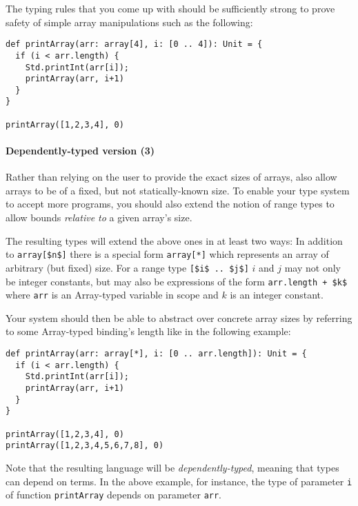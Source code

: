 The typing rules that you come up with should be sufficiently strong to prove safety of
simple array manipulations such as the following:

\begin{lstlisting}
def printArray(arr: array[4], i: [0 .. 4]): Unit = {
  if (i < arr.length) {
    Std.printInt(arr[i]);
    printArray(arr, i+1)
  }
}

printArray([1,2,3,4], 0)
\end{lstlisting}


\paragraph{Dependently-typed version (3)}

Rather than relying on the user to provide the exact sizes of arrays, also allow arrays
to be of a fixed, but not statically-known size. To enable your type system to accept
more programs, you should also extend the notion of range types to allow bounds
\emph{relative to} a given array's size.

The resulting types will extend the above ones in at least two ways:
In addition to \lstinline{array[$n$]} there is a special form \lstinline{array[*]}
which represents an array of arbitrary (but fixed) size.
For a range type \lstinline{[$i$ .. $j$]} $i$ and $j$ may not only be integer constants,
but may also be expressions of the form \lstinline{arr.length + $k$} where
\lstinline{arr} is an Array-typed variable in scope and $k$ is an integer constant.

Your system should then be able to abstract over concrete array sizes by referring to
some Array-typed binding's length like in the following example:

\begin{lstlisting}
def printArray(arr: array[*], i: [0 .. arr.length]): Unit = {
  if (i < arr.length) {
    Std.printInt(arr[i]);
    printArray(arr, i+1)
  }
}

printArray([1,2,3,4], 0)
printArray([1,2,3,4,5,6,7,8], 0)
\end{lstlisting}

Note that the resulting language will be \emph{dependently-typed}, meaning that
types can depend on terms. In the above example, for instance, the type of parameter
\lstinline{i} of function \lstinline{printArray} depends on parameter \lstinline{arr}.



